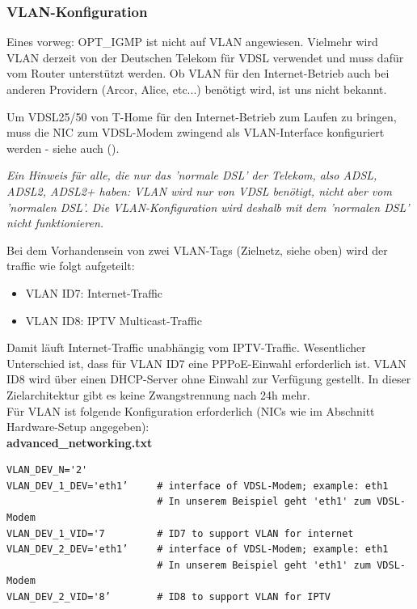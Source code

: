 \subsubsection{VLAN-Konfiguration}

Eines vorweg: OPT\_IGMP ist nicht auf VLAN angewiesen. Vielmehr wird VLAN
derzeit von der Deutschen Telekom für VDSL verwendet und muss dafür vom Router
unterstützt werden. Ob VLAN für den Internet-Betrieb auch bei anderen Providern
(Arcor, Alice, etc...) benötigt wird, ist uns nicht bekannt.

Um VDSL25/50 von T-Home für den Internet-Betrieb zum Laufen zu bringen, muss die
NIC zum VDSL-Modem zwingend als VLAN-Interface konfiguriert werden - siehe auch
().

\vspace{3mm}
\emph{Ein Hinweis für alle, die nur das 'normale DSL' der Telekom, also ADSL,
ADSL2, ADSL2+ haben: VLAN wird nur von VDSL benötigt, nicht aber vom 'normalen
DSL'. Die VLAN-Konfiguration wird deshalb mit dem 'normalen DSL' nicht
funktionieren.}
\vspace{3mm}

Bei dem Vorhandensein von zwei VLAN-Tags (Zielnetz, siehe oben) wird der
traffic wie folgt aufgeteilt:

\begin{itemize}
   \item{VLAN ID7: Internet-Traffic}
   \item{VLAN ID8: IPTV Multicast-Traffic}
\end{itemize}

Damit läuft Internet-Traffic unabhängig vom IPTV-Traffic. Wesentlicher
Unterschied ist, dass für VLAN ID7 eine PPPoE-Einwahl erforderlich ist.
VLAN ID8 wird über einen DHCP-Server ohne Einwahl zur Verfügung gestellt.
In dieser Zielarchitektur gibt es keine Zwangstrennung nach 24h mehr.\\

Für VLAN ist folgende Konfiguration erforderlich (NICs wie im Abschnitt
Hardware-Setup angegeben):\\

\noindent \textbf{advanced\_networking.txt}

\begin{example}
\begin{verbatim}
VLAN_DEV_N='2'
VLAN_DEV_1_DEV='eth1’     # interface of VDSL-Modem; example: eth1
                          # In unserem Beispiel geht 'eth1' zum VDSL-Modem
VLAN_DEV_1_VID='7         # ID7 to support VLAN for internet
VLAN_DEV_2_DEV='eth1’     # interface of VDSL-Modem; example: eth1
                          # In unserem Beispiel geht 'eth1' zum VDSL-Modem
VLAN_DEV_2_VID='8’        # ID8 to support VLAN for IPTV
\end{verbatim}
\end{example}

